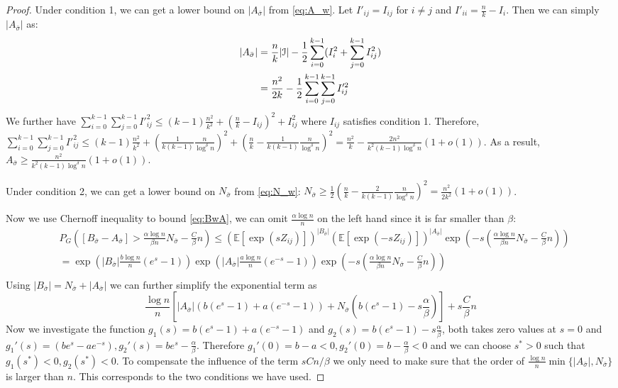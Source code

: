 \documentclass{article}
\begin{document}
\begin{proof}
	Under condition 1, we can get a lower bound on $|A_{\bar{\sigma}}|$ from \eqref{eq:A_w}. Let $I'_{ij} = I_{ij}$ for $i\neq j$ and
	$I'_{ii} = \frac{n}{k} - I_i$. Then we can simply $|A_{\bar{\sigma}}|$ as:
	\begin{align*}
	|A_{\bar{\sigma}}| &= \frac{n}{k}|\mathcal{I}| - \frac{1}{2}\sum_{i=0}^{k-1}  (I^2_i + \sum_{j=0}^{k-1} I^2_{ij}) \\
	&= \frac{n^2}{2k} - \frac{1}{2} \sum_{i=0}^{k-1} \sum_{j=0}^{k-1} I'^2_{ij}
	\end{align*}
	We further have $\sum_{i=0}^{k-1} \sum_{j=0}^{k-1} I'^2_{ij} \leq (k-1)\frac{n^2}{k^2} + (\frac{n}{k} - I_{ij})^2 + I^2_{ij}$ where
	$I_{ij}$ satisfies condition 1. Therefore, $\sum_{i=0}^{k-1} \sum_{j=0}^{k-1} I'^2_{ij} \leq (k-1)\frac{n^2}{k^2} + (\frac{1}{k(k-1)}\frac{n}{\log^{\delta} n})^2
	+ (\frac{n}{k} - \frac{1}{k(k-1)}\frac{n}{\log^{\delta} n})^2 = \frac{n^2}{k} - \frac{2n^2}{k^2 (k-1)\log^\delta n}(1+o(1))$.
	As a result, $A_{\bar{\sigma}} \geq \frac{n^2}{k^2 (k-1)\log^\delta n}(1+o(1))$.
	
	Under condition 2, we can get a lower bound on $N_{\bar{\sigma}}$ from \eqref{eq:N_w}: $N_{\bar{\sigma}} \geq \frac{1}{2}(\frac{n}{k} - \frac{2}{k(k-1)}\frac{n}{\log^{\delta} n})^2 = \frac{n^2}{2k^2}(1+o(1))$.
	
	Now we use Chernoff inequality to bound \eqref{eq:BwA}, we can omit $\frac{\alpha \log n}{n}$ on the left hand since it is far smaller than $\beta$:
	\begin{align*}
	&P_G([B_{\bar{\sigma}} - A_{\bar{\sigma}}] >  \frac{\alpha \log n}{\beta n} N_{\bar{\sigma}}  - \frac{C}{\beta}n)
	\leq (\mathbb{E}[\exp(sZ_{ij})])^{|B_{\bar{\sigma}}|}(\mathbb{E}[\exp(-sZ_{ij})])^{|A_{\bar{\sigma}}|} \exp(-s(\frac{\alpha \log n}{\beta n} N_{\bar{\sigma}}  - \frac{C}{\beta}n)) \\
	& =\exp(|B_{\bar{\sigma}}|\frac{b\log n}{n}(e^s -1)) \exp(|A_{\bar{\sigma}}|\frac{a\log n}{n} (e^{-s} - 1))\exp(-s(\frac{\alpha \log n}{\beta n} N_{\bar{\sigma}}  - \frac{C}{\beta}n)) \\
	\end{align*}
	Using $|B_{\bar{\sigma}}| = N_{\bar{\sigma}} + |A_{\bar{\sigma}}|$ we can further simplify the exponential term as
	$$
	\frac{\log n}{n} [|A_{\bar{\sigma}}|(b(e^s -1)+ a(e^{-s} - 1)) +
	N_{\bar{\sigma}} (b(e^s - 1)-s\frac{\alpha}{\beta})]  + s \frac{C}{\beta}n
	$$
	Now we investigate the function $g_1(s) = b(e^s -1)+ a(e^{-s} - 1)$ and $g_2(s) = b(e^s - 1)-s\frac{\alpha}{\beta}$,
	both takes zero values at $s=0$ and $g_1'(s) = (be^s - ae^{-s}), g_2'(s) = be^s -\frac{\alpha}{\beta}$.
	Therefore $g_1'(0) = b-a<0, g_2'(0) = b - \frac{\alpha}{\beta} < 0$ and we can choose $s^*>0$ such that $g_1(s^*) < 0,g_2(s^*) < 0$.
	To compensate the influence of the term $sCn/\beta$ we only need to make sure that the order of $\frac{\log n}{n} \min\{|A_{\bar{\sigma}}|, N_{\bar{\sigma}}\}$ is larger than $n$.
	This corresponds to the two conditions we have used.
\end{proof}
\end{document}
